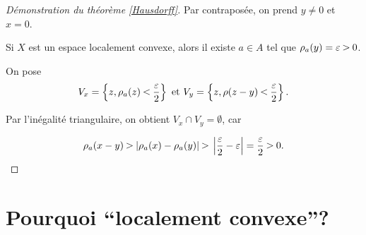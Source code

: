 \documentclass[french]{book}
\newcommand{\lesss}{\rotatebox[origin=c]{90}{$\land$}}
\newcommand{\less}{\ \lesss\ }
\newcommand{\biggg}{\rotatebox[origin=c]{90}{$\lor$}}
\newcommand{\bg}{\ \biggg\ }
\begin{document}
\begin{proof}[Démonstration du théorème \ref{Hausdorff}]
  Par contraposée, on prend $y \neq 0$ et $ x = 0$.

  Si $X$ est un espace localement convexe, alors il existe $a \in A$ tel que $\rho_a(y) = \varepsilon \bg 0$.

  On pose
  \begin{gather}
    V_x = \left\{ z, \rho_a(z) \less \frac{\varepsilon }{2} \right\} \text{ et } V_y = \left\{ z, \rho(z-y) \less \frac{\varepsilon }{2} \right\} .
  \end{gather}

  Par l'inégalité triangulaire, on obtient $V_x \cap V_y = \emptyset$, car

  \begin{gather*}
    \rho_a(x-y) \bg \lvert \rho_a(x) - \rho_a(y) \rvert \bg \left\lvert \frac{\varepsilon }{2} - \varepsilon  \right\rvert = \frac{\varepsilon }{2} \bg 0.
  \end{gather*}






\end{proof}

\section{Pourquoi ``localement convexe''?}
\end{document}
